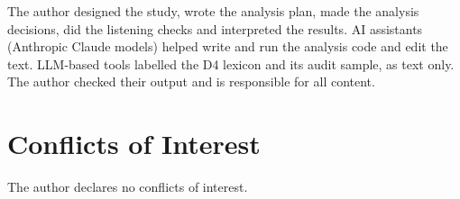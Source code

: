 \documentclass[conference]{IEEEtran}
\begin{document}
The author designed the study, wrote the analysis plan, made the analysis decisions, did
the listening checks and interpreted the results. AI assistants (Anthropic Claude models)
helped write and run the analysis code and edit the text. LLM-based tools labelled the D4 lexicon and its audit sample, as text only. The author checked their output and is responsible for all content.

\section*{Conflicts of Interest}
The author declares no conflicts of interest.



\end{document}
